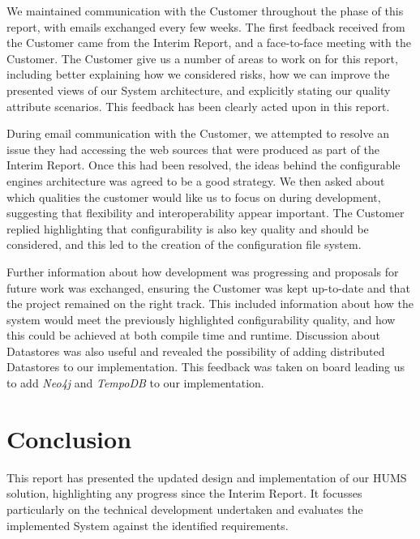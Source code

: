 \documentclass[10pt,a4paper]{article}
\begin{document}
We maintained communication with the Customer throughout the phase of this report, with emails exchanged every few weeks. The first feedback received from the Customer came from the Interim Report, and a face-to-face meeting with the Customer. The Customer give us a number of areas to work on for this report, including better explaining how we considered risks, how we can improve the presented views of our System architecture, and explicitly stating our quality attribute scenarios. This feedback has been clearly acted upon in this report.

During email communication with the Customer, we attempted to resolve an issue they had accessing the web sources that were produced as part of the Interim Report. Once this had been resolved, the ideas behind the configurable engines architecture was agreed to be a good strategy. We then asked about which qualities the customer would like us to focus on during development, suggesting that flexibility and interoperability appear important. The Customer replied highlighting that configurability is also key quality and should be considered, and this led to the creation of the configuration file system. 

Further information about how development was progressing and proposals for future work was exchanged, ensuring the Customer was kept up-to-date and that the project remained on the right track. This included information about how the system would meet the previously highlighted configurability quality, and how this could be achieved at both compile time and runtime. Discussion about Datastores was also useful and revealed the possibility of adding distributed Datastores to our implementation. This feedback was taken on board leading us to add \emph{Neo4j} and \emph{TempoDB} to our implementation.



\section{Conclusion}
\label{sec:conclusion}

This report has presented the updated design and implementation of our HUMS solution, highlighting any progress since the Interim Report. It focusses particularly on the technical development undertaken and evaluates the implemented System against the identified requirements.
\end{document}
